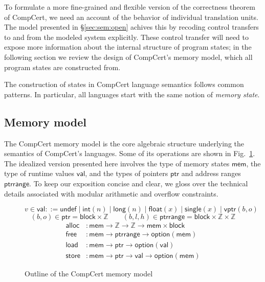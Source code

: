 \documentclass[draft,11pt]{report}
\newcommand{\kw}[1]{\ensuremath{ \mathsf{#1} }}
\newcommand{\figsize}{}
\begin{document}
To formulate a more fine-grained and flexible
version of the correctness theorem of CompCert,
we need an account of
the behavior of individual translation units.
The model presented in \S\ref{sec:sem:open}
achives this by recoding control transfers
to and from the modeled system explicitly.
These control transfer will need to expose more information
about the internal structure of program states;
in the following section we review the design of
CompCert's memory model,
which all program states are constructed from.

The construction of states in CompCert language semantics
follows common patterns.
In particular,
all languages start with
the same notion of \emph{memory state}.


\subsection{Memory model} \label{sec:sem:mm} %

The CompCert memory model \citep{compcertmm,compcertmmv2}
is the core algebraic structure
underlying the semantics of CompCert's languages.
Some of its operations
are shown in Fig.~\ref{fig:mm}.
The idealized version presented here
involves
the type of memory states \kw{mem},
the type of runtime values \kw{val}, and
the types of pointers \kw{ptr} and address ranges \kw{ptrrange}.
To keep our exposition concise and clear,
we gloss over the technical details
associated with modular arithmetic and overflow constraints.

\begin{figure} %
  \figsize
  \[
    v \in \kw{val} ::=
          \kw{undef} \mid
          \kw{int}(n) \mid
          \kw{long}(n) \mid
          \kw{float}(x) \mid
          \kw{single}(x) \mid
          \kw{vptr}(b, o)
  \]
  \[
    (b, o) \in \kw{ptr} =
      \kw{block} \times \mathbb{Z}
    \qquad
    (b, l, h) \in \kw{ptrrange} =
      \kw{block} \times \mathbb{Z} \times \mathbb{Z}
  \]
  \begin{align*}
    \kw{alloc} &:
      \kw{mem} \rightarrow \mathbb{Z} \rightarrow \mathbb{Z} \rightarrow
      \kw{mem} \times \kw{block}
    \\
    \kw{free} &:
      \kw{mem} \rightarrow
      \kw{ptrrange} \rightarrow
      \kw{option}(\kw{mem})
    \\
    \kw{load} &:
      \kw{mem} \rightarrow \kw{ptr} \rightarrow \kw{option}(\kw{val})
    \\
    \kw{store} &:
      \kw{mem} \rightarrow \kw{ptr} \rightarrow \kw{val} \rightarrow \kw{option}(\kw{mem})
  \end{align*}
  \caption{Outline of the CompCert memory model}
  \label{fig:mm}
\end{figure}
\end{document}
